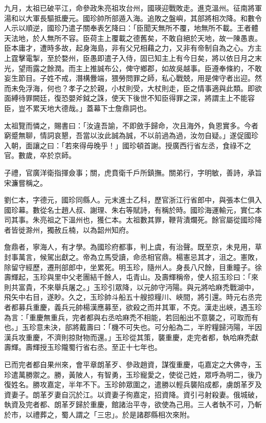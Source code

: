 九月，太祖已破平江，命參政朱亮祖攻台州，國瑛迎戰敗走。進克溫州。征南將軍湯和以大軍長驅抵慶元。國珍帥所部遁入海。追敗之盤嶼，其部將相次降。和數令人示以順逆，國珍乃遣子關奉表乞降曰：「臣聞天無所不覆，地無所不載。王者體天法地，於人無所不容。臣荷主上覆載之德舊矣，不敢自絕於天地，故一陳愚衷。臣本庸才，遭時多故，起身海島，非有父兄相藉之力，又非有帝制自為之心。方主上霆擊電掣，至於婺州，臣愚即遣子入侍，固已知主上有今日矣，將以依日月之末光，望雨露之餘潤。而主上推誠布公，俾守鄉郡，如故吳越事。臣遵奉條約，不敢妄生節目。子姓不戒，潛構釁端，猥勞問罪之師，私心戰兢，用是俾守者出迎。然而未免浮海，何也？孝子之於親，小杖則受，大杖則走，臣之情事適與此類。即欲面縛待罪闕廷，復恐嬰斧鉞之誅，使天下後世不知臣得罪之深，將謂主上不能容臣，豈不累天地大德哉。」蓋幕下士詹鼎詞也。

太祖覽而憐之，賜書曰：「汝違吾諭，不即斂手歸命，次且海外，負恩實多。今者窮蹙無聊，情詞哀懇，吾當以汝此誠為誠，不以前過為過，汝勿自疑。」遂促國珍入朝，面讓之曰：「若來得毋晚乎！」國珍頓首謝。授廣西行省左丞，食祿不之官。數歲，卒於京師。

子禮，官廣洋衛指揮僉事；關，虎賁衛千戶所鎮撫。關弟行，字明敏，善詩，承旨宋濂嘗稱之。

劉仁本，字德元，國珍同縣人。元末進士乙科，歷官浙江行省郎中，與張本仁俱入國珍幕。數從名士趙人叔、謝理、朱右等賦詩，有稱於時。國珍海運輸元，實仁本司其事。朱亮祖之下溫州也，獲仁本。太祖數其罪，鞭背潰爛死。餘官屬從國珍降者皆徙滁州，獨赦丘楠，以為韶州知府。

詹鼎者，寧海人，有才學。為國珍府都事，判上虞，有治聲。既至京，未見用，草封事萬言，候駕出獻之。帝為立馬受讀，命丞相官鼎。楊憲忌其才，沮之。憲敗，除留守經歷，遷刑部郎中，坐累死。明玉珍，隨州人。身長八尺餘，目重瞳子。徐壽輝起，玉珍與里中父老團結千餘人，屯青山。及壽輝稱帝，使人招玉珍曰：「來則共富貴，不來舉兵屠之。」玉珍引眾降，以元帥守沔陽。與元將哈麻禿戰湖中，飛矢中右目，遂眇。久之，玉珍帥斗船五十艘掠糧川、峽間，將引還。時元右丞完者都募兵重慶，義兵元帥楊漢應募至，欲殺之而并其軍，不克。漢走出峽，遇玉珍為言：「重慶無重兵，完者都與右丞哈麻禿不相能，若回船出不意襲之，可取而有也。」玉珍意未決，部將戴壽曰：「機不可失也。可分船為二，半貯糧歸沔陽，半因漢兵攻重慶，不濟則掠財物而還。」玉珍從其策，襲重慶，走完者都，執哈麻禿獻壽輝。壽輝授玉珍隴蜀行省右丞。至正十七年也。

已而完者都自果州來，會平章朗革歹、參政趙資，謀復重慶，屯嘉定之大佛寺，玉珍遣萬勝禦之。勝，黃陂人，有智勇，玉珍寵愛之，使從己姓，眾呼為明二，後乃復姓名。勝攻嘉定，半年不下。玉珍帥眾圍之，遣勝以輕兵襲陷成都，虜朗革歹及資妻子。朗革歹妻自沉於江。以資妻子徇嘉定，招資降。資引弓射殺妻。俄城破，執資及完者都、朗革歹歸於重慶，館諸治平寺，欲使為己用。三人者執不可，乃斬於市，以禮葬之，蜀人謂之「三忠」。於是諸郡縣相次來附。

